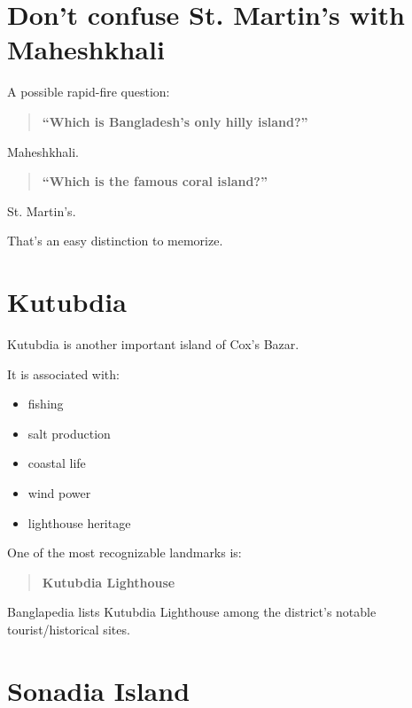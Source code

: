 \medskip

\section{Don't confuse St. Martin's with Maheshkhali}

A possible rapid-fire question:

\begin{quote}
\textbf{``Which is Bangladesh's only hilly island?''}\\
\end{quote}

Maheshkhali.

\begin{quote}
\textbf{``Which is the famous coral island?''}\\
\end{quote}

St. Martin's.

That's an easy distinction to memorize.

\medskip

\section{Kutubdia}

Kutubdia is another important island of Cox's Bazar.

It is associated with:

\begin{itemize}
  \item fishing
  \item salt production
  \item coastal life
  \item wind power
  \item lighthouse heritage
\end{itemize}

One of the most recognizable landmarks is:

\begin{quote}
\textbf{Kutubdia Lighthouse}\\
\end{quote}

Banglapedia lists Kutubdia Lighthouse among the district's notable tourist/historical sites.

\medskip

\section{Sonadia Island}

